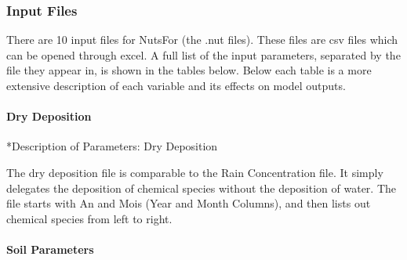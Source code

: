\documentclass[
]{article}
\begin{document}
\hypertarget{input-files}{%
\subsubsection{Input Files}\label{input-files}}

There are 10 input files for NutsFor (the .nut files). These files are
csv files which can be opened through excel. A full list of the input
parameters, separated by the file they appear in, is shown in the tables
below. Below each table is a more extensive description of each variable
and its effects on model outputs.

\hypertarget{dry-deposition}{%
\paragraph{Dry Deposition}\label{dry-deposition}}

\begin{table}

\caption{\label{tab:unnamed-chunk-3}Dry Deposition File}
\centering
{}
\end{table}

*Description of Parameters: Dry Deposition

The dry deposition file is comparable to the Rain Concentration file. It
simply delegates the deposition of chemical species without the
deposition of water. The file starts with An and Mois (Year and Month
Columns), and then lists out chemical species from left to right.

\hypertarget{soil-parameters}{%
\paragraph{Soil Parameters}\label{soil-parameters}}
\end{document}
